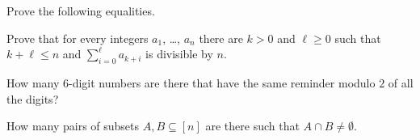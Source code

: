 \documentclass[addpoints,answers]{exam}
\begin{document}
    \pagestyle{headandfoot}
    \runningheadrule

    \firstpagefooter{}{}{}
    \runningfooter{}{}{}
    \begin{flushright}

        \vspace{0.2in}

    \end{flushright}

    \begin{questions}
        \question[20]
            Prove the following equalities.
            \newpage
  
 
        \question[20]
            Prove that for every integers $a_1$, \dots, $a_n$ there are $k > 0$ and $\ell
            \ge 0$ such that
            $k + \ell \le n$ and $\sum\limits_{i = 0}^\ell a_{k + i}$ is divisible by $n$.
            \begin{solutionorbox}[\stretch{1}]
            \end{solutionorbox}
            \newpage
 
        \question[10]
            How many $6$-digit numbers are there that have the same reminder modulo $2$ of all
            the digits?
            \begin{solutionorbox}[\stretch{1}]
            \end{solutionorbox}
            \newpage
 
        \question[20]
            How many pairs of subsets $A, B \subseteq [n]$ are there such that $A \cap B
            \neq \emptyset$.
            \begin{solutionorbox}[\stretch{1}]
            \end{solutionorbox}
            \newpage
 
\end{questions}
\end{document}
